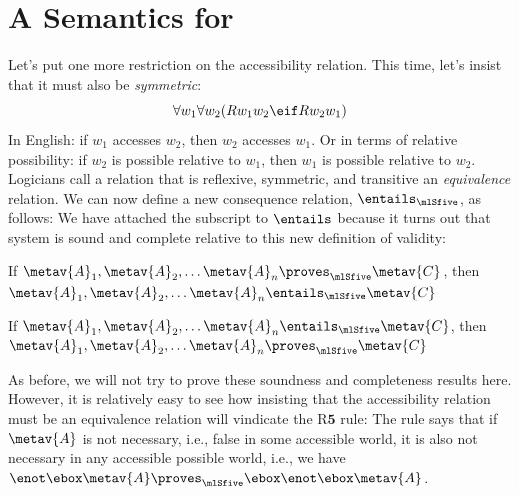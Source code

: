 \section{A Semantics for \mlSfive}
\label{SemanticsS5}

Let's put one more restriction on the accessibility relation. This time, let's insist that it must also be \emph{symmetric}:
\[\forall w_1\forall w_2(Rw_1w_2 \eif Rw_2w_1)\]
In English: if $w_1$ accesses $w_2$, then $w_2$ accesses $w_1$. Or in terms of relative possibility: if $w_2$ is possible relative to $w_1$, then $w_1$ is possible relative to $w_2$. Logicians call a relation that is reflexive, symmetric, and transitive an \emph{equivalence} relation. We can now define a new consequence relation, $\entails_\mlSfive $, as follows:
We have attached the \mlSfive{} subscript to $\entails$ because it turns out that system \mlSfive{} is sound and complete relative to this new definition of validity:
\begin{compactlist}
	\item If $\metav{A}_1,\metav{A}_2, \dots \metav{A}_n\proves_\mlSfive \metav{C}$, then $\metav{A}_1,\metav{A}_2, \dots \metav{A}_n\entails_\mlSfive \metav{C}$
	\item If $\metav{A}_1,\metav{A}_2, \dots \metav{A}_n\entails_\mlSfive \metav{C}$, then $\metav{A}_1,\metav{A}_2, \dots \metav{A}_n\proves_\mlSfive \metav{C}$
\end{compactlist}
As before, we will not try to prove these soundness and completeness results here. However, it is relatively easy to see how insisting that the accessibility relation must be an equivalence relation will vindicate the R$\mathbf{5}$ rule:
The rule says that if $\metav{A}$ is not necessary, i.e., false in some accessible world, it is also not necessary in any accessible possible world, i.e., we have $\enot\ebox \metav{A} \proves_\mlSfive  \ebox\enot\ebox \metav{A}$.

